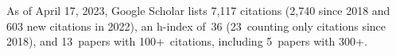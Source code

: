 %
As of April 17, 2023, Google Scholar lists
7,117 citations (2,740 since 2018 and 603 new citations in 2022),
an h-index of~36 (23~counting only citations since 2018),
and 13~papers with 100+~citations, including 5~papers with 300+.
